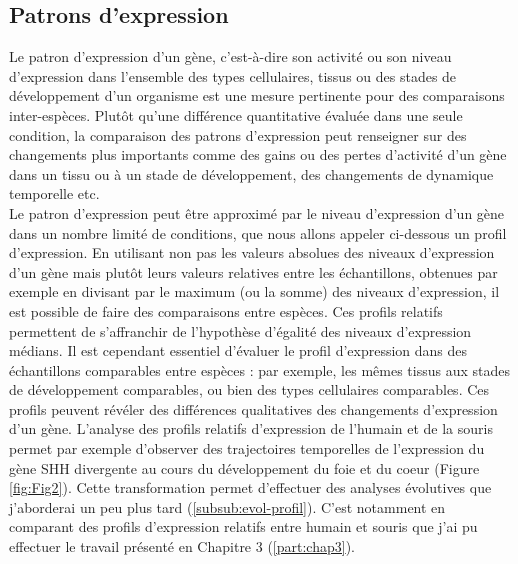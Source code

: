 \subsection{Patrons d’expression}
\label{subsec:Patron-expression}

Le patron d’expression d’un gène, c’est-à-dire son activité ou son niveau d’expression dans l’ensemble des types cellulaires, tissus ou des stades de développement d’un organisme est une mesure pertinente pour des comparaisons inter-espèces. Plutôt qu’une différence quantitative évaluée dans une seule condition, la comparaison des patrons d’expression peut renseigner sur des changements plus importants comme des gains ou des pertes d’activité d’un gène dans un tissu ou à un stade de développement, des changements de dynamique temporelle etc. \\

Le patron d’expression peut être approximé par le niveau d’expression d’un gène dans un nombre limité de \glspl{condition}, que nous allons appeler ci-dessous un profil d’expression. En utilisant non pas les valeurs absolues des niveaux d’expression d’un gène mais plutôt leurs valeurs relatives entre les échantillons, obtenues par exemple en divisant par le maximum (ou la somme) des niveaux d'expression, il est possible de faire des comparaisons entre espèces. Ces profils relatifs permettent de s’affranchir de l’hypothèse d’égalité des niveaux d’expression médians. Il est cependant essentiel d’évaluer le profil d’expression dans des échantillons comparables entre espèces : par exemple, les mêmes tissus aux stades de développement comparables, ou bien des types cellulaires comparables. Ces profils peuvent révéler des différences qualitatives des changements d’expression d’un gène. L’analyse des profils relatifs d'expression de l’humain et de la souris permet par exemple d’observer des trajectoires temporelles de l'expression du gène \acrshort{SHH} divergente au cours du développement du foie et du coeur (Figure \ref{fig:Fig2}). Cette transformation permet d’effectuer des analyses évolutives que j’aborderai un peu plus tard (\ref{subsub:evol-profil}). C’est notamment en comparant des profils d’expression relatifs entre humain et souris que j’ai pu effectuer le travail présenté en Chapitre 3 (\ref{part:chap3}). \\

